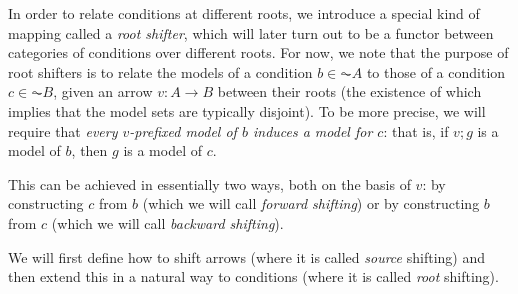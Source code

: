 In order to relate conditions at different roots, we introduce a special kind of mapping called a \emph{root shifter}, which will later turn out to be a functor between categories of conditions over different roots. For now, we note that the purpose of root shifters is to relate the models of a condition $b\in \AC A$ to those of a condition $c\in \AC B$, given an arrow $v:A\to B$ between their roots (the existence of which implies that the model sets are typically disjoint). To be more precise, we will require that \emph{every $v$-prefixed model of $b$ induces a model for $c$}: that is, if $v;g$ is a model of $b$, then $g$ is a model of $c$.

This can be achieved in essentially two ways, both on the basis of $v$: by constructing $c$ from $b$ (which we will call \emph{forward shifting}) or by constructing $b$ from $c$ (which we will call \emph{backward shifting}).

We will first define how to shift arrows (where it is called \emph{source} shifting) and then extend this in a natural way to conditions (where it is called \emph{root} shifting).


